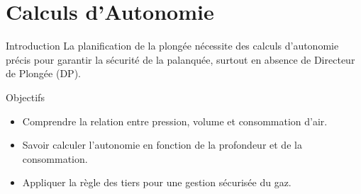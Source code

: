 
\section{Calculs d'Autonomie}

\begin{frame}{Introduction}
    La planification de la plongée nécessite des calculs d'autonomie précis 
    pour garantir la sécurité de la palanquée, surtout en absence de Directeur de Plongée (DP).
    \begin{block}{Objectifs}
        \begin{itemize}
            \item Comprendre la relation entre pression, volume et consommation d'air.
            \item Savoir calculer l'autonomie en fonction de la profondeur et de la consommation.
            \item Appliquer la règle des tiers pour une gestion sécurisée du gaz.
        \end{itemize}
    \end{block}
\end{frame}

